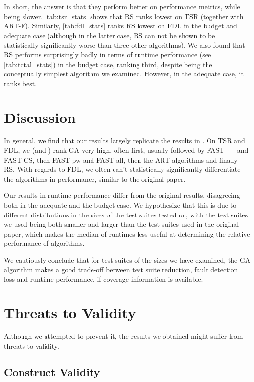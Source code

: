 In short, the answer is that they perform better on performance metrics,
while being slower. \autoref{tab:tsr_stats} shows that RS ranks lowest
on TSR (together with ART-F). Similarly, \autoref{tab:fdl_stats} ranks
RS lowest on FDL in the budget and adequate case (although in the latter
case, RS can not be shown to be statistically significantly worse than
three other algorithms). We also found that RS performs surprisingly
badly in terms of runtime performance (see \autoref{tab:total_stats}) in
the budget case, ranking third, despite being the conceptually simplest
algorithm we examined. However, in the adequate case, it ranks best.

\section{Discussion}

In general, we find that our results largely replicate the
results in \cite{cruciani2019scalable}. On TSR and FDL, we (and
\cite{cruciani2019scalable}) rank GA very high, often first, usually
followed by FAST++ and FAST-CS, then FAST-pw and FAST-all, then the
ART algorithms and finally RS. With regards to FDL, we often can't
statistically significantly differentiate the algorithms in performance,
similar to the original paper.

Our results in runtime performance differ from the original results,
disagreeing both in the adequate and the budget case. We hypothesize
that this is due to different distributions in the sizes of the test
suites tested on, with the test suites we used being both smaller and
larger than the test suites used in the original paper, which makes the
median of runtimes less useful at determining the relative performance
of algorithms.

We cautiously conclude that for test suites of the sizes we have examined,
the GA algorithm makes a good trade-off between test suite reduction,
fault detection loss and runtime performance, if coverage information
is available.

\section{Threats to Validity}

Although we attempted to prevent it, the results we obtained might suffer
from threats to validity.

\subsection{Construct Validity}

